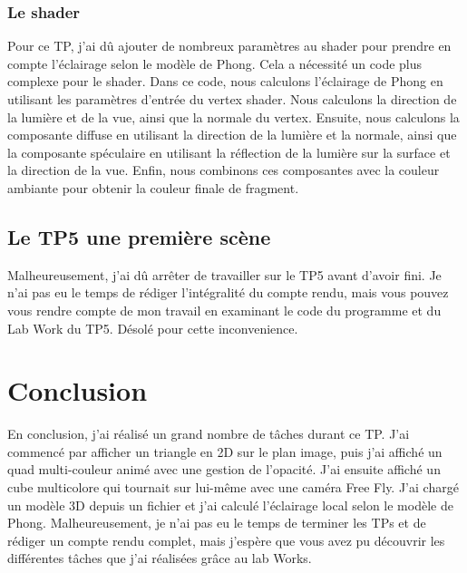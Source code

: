 \documentclass[10pt,a4paper]{article}
\begin{document}
			

		\subsubsection{Le shader} %
			Pour ce TP, j'ai dû ajouter de nombreux paramètres au shader pour prendre en compte l'éclairage selon le modèle de Phong. Cela a nécessité un code plus complexe pour le shader. Dans ce code, nous calculons l'éclairage de Phong en utilisant les paramètres d'entrée du vertex shader. Nous calculons la direction de la lumière et de la vue, ainsi que la normale du vertex. Ensuite, nous calculons la composante diffuse en utilisant la direction de la lumière et la normale, ainsi que la composante spéculaire en utilisant la réflection de la lumière sur la surface et la direction de la vue. Enfin, nous combinons ces composantes avec la couleur ambiante pour obtenir la couleur finale de fragment.


			


	\subsection{Le TP5 une première scène} %
		Malheureusement, j'ai dû arrêter de travailler sur le TP5 avant d'avoir fini. Je n'ai pas eu le temps de rédiger l'intégralité du compte rendu, mais vous pouvez vous rendre compte de mon travail en examinant le code du programme et du Lab Work du TP5. Désolé pour cette inconvenience.
	
\section{Conclusion}
	En conclusion, j'ai réalisé un grand nombre de tâches durant ce TP. J'ai commencé par afficher un triangle en 2D sur le plan image, puis j'ai affiché un quad multi-couleur animé avec une gestion de l'opacité. J'ai ensuite affiché un cube multicolore qui tournait sur lui-même avec une caméra Free Fly. J'ai chargé un modèle 3D depuis un fichier et j'ai calculé l'éclairage local selon le modèle de Phong. Malheureusement, je n'ai pas eu le temps de terminer les TPs et de rédiger un compte rendu complet, mais j'espère que vous avez pu découvrir les différentes tâches que j'ai réalisées grâce au lab Works.
\end{document}
